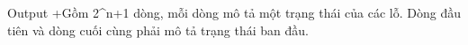 Output
+Gồm 2^n+1 dòng, mỗi dòng mô tả một trạng thái của các lỗ. Dòng đầu tiên và dòng cuối cùng phải mô tả trạng thái ban đầu.